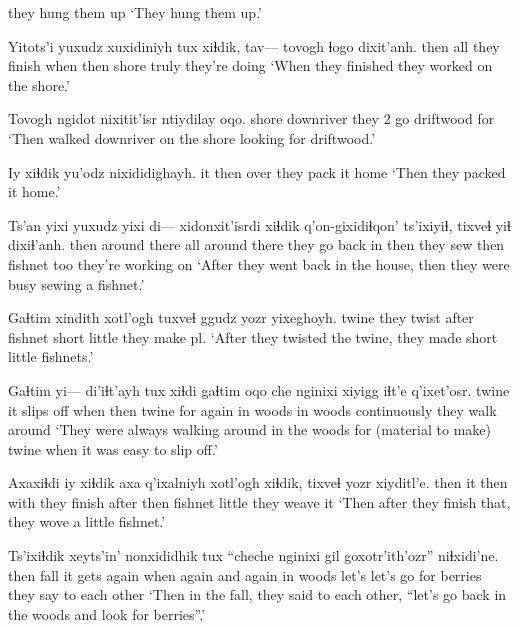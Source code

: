\documentclass[12pt]{article}
\begin{document}
{{they hung them up}}
\glt `They hung them up.'
\glend

\gll Yitots'i yuxudz xuxidiniyh tux   xiɬdik, tav--- tovogh ɬogo dixit'anh.
then     all    {they finish} when then {}  shore  truly {they're doing}
\glt `When they finished they worked on the shore.'
\glend

\gll Tovogh ngidot    nixitit'isr ntiydilay oqo.
shore  downriver {they 2 go}   driftwood   for
\glt `Then walked downriver on the shore looking for driftwood.'
\glend

\gll Iy xiɬdik yu'odz nixididighayh.
it then   over   {they pack it home}
\glt `Then they packed it home.'
\glend

\gll Ts'an yixi yuxudz yixi di--- xidonxit'isrdi  xiɬdik q'on-gixidiɬqon' ts'ixiyiɬ, tixveɬ  yiɬ dixiɬ'anh.
then  {around there}  all   {around there}      {}   {they go back in} then   {they sew}        then  fishnet too {they're working on}
\glt `After they went back in the house, then they were busy sewing a fishnet.'
\glend
 
\gll Gaɬtim xindith    xotl'ogh tuxveɬ  ggudz yozr   yixeghoyh.
twine  {they twist} after    fishnet short little {they make pl.}
\glt `After they twisted the twine, they made short little fishnets.'
\glend

\gll Gaɬtim yi--- di'iɬt'ayh   tux  xiɬdi gaɬtim oqo che   nginixi      xiyigg  iɬt'e        q'ixet'osr.
twine {} {it slips off} when then  twine  for again {in woods} {in woods} continuously {they walk around}
\glt `They were always walking around in the woods for (material to make) twine when it was easy to slip off.'
\glend

\gll Axaxiɬdi iy xiɬdik axa  q'ixalniyh  xotl'ogh xiɬdik, tixveɬ  yozr   xiyditl'e.
then     it then   with {they finish} after    then   fishnet little {they weave it}
\glt `Then after they finish that, they wove a little fishnet.'
\glend

\gll Ts'ixiɬdik xeyts'in' nonxididhik   tux  ``cheche nginixi  gil   goxotr'ith'ozr''       niɬxidi'ne.
then       fall      {it gets again} when {again and again}  {in woods} {let's} {let's go for berries} {they say to each other}
\glt `Then in the fall, they said to each other, ``let's go back in the woods and look for berries''.'
\glend
\end{document}
